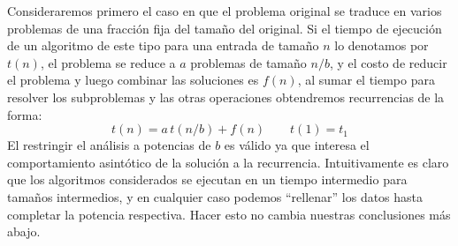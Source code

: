   Consideraremos primero el caso en que el problema original
  se traduce en varios problemas
  de una fracción fija del tamaño del original.
  Si el tiempo de ejecución de un algoritmo de este tipo
  para una entrada de tamaño \(n\)
  lo denotamos por \(t(n)\),
  el problema se reduce a \(a\) problemas de tamaño \(n / b\),
  y el costo de reducir el problema y luego combinar las soluciones
  es \(f(n)\),
  al sumar el tiempo para resolver los subproblemas
  y las otras operaciones
  obtendremos recurrencias de la forma:
  \begin{equation*}
    t(n) = a \, t(n / b) + f(n) \qquad t(1) = t_1
  \end{equation*}
  El restringir el análisis a potencias de \(b\)
  es válido ya que interesa el comportamiento asintótico
  de la solución a la recurrencia.
  Intuitivamente es claro que los algoritmos considerados
  se ejecutan en un tiempo intermedio para tamaños intermedios,
  y en cualquier caso podemos ``rellenar''
  los datos hasta completar la potencia respectiva.
  Hacer esto no cambia nuestras conclusiones más abajo.

